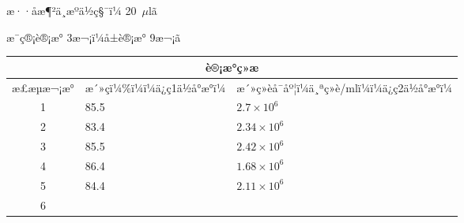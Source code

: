 \documentclass[UTF8,10pt,a4paper,fontset=fandol]{ctexart}
\newcommand{\fieldvalue}[1]{#1}
\newcommand{\handwritten}[1]{#1}
\begin{document}
æ··åæ¶²ä¸æºä½ç§¯ï¼
\fieldvalue{\handwritten{20}}~$\mu$lã

æ¯ç®¡è®¡æ°
\fieldvalue{\handwritten{3}}æ¬¡ï¼å±è®¡æ°
\fieldvalue{\handwritten{9}}æ¬¡ã

\begin{center}
\small
\begin{tabularx}{\textwidth}{|c|X|X|}
\hline
\multicolumn{3}{|c|}{è®¡æ°ç»æ}\\
\hline
æ£æµæ¬¡æ° & æ´»çï¼\%ï¼ï¼ä¿ç1ä½å°æ°ï¼ & æ´»ç»èå¯åº¦ï¼ä¸ªç»è/mlï¼ï¼ä¿ç2ä½å°æ°ï¼\\
\hline
1 &
\fieldvalue{\handwritten{85.5}} &
\fieldvalue{\handwritten{$2.7\times10^{6}$}}\\
\hline
2 &
\fieldvalue{\handwritten{83.4}} &
\fieldvalue{\handwritten{$2.34\times10^{6}$}}\\
\hline
3 &
\fieldvalue{\handwritten{85.5}} &
\fieldvalue{\handwritten{$2.42\times10^{6}$}}\\
\hline
4 &
\fieldvalue{\handwritten{86.4}} &
\fieldvalue{\handwritten{$1.68\times10^{6}$}}\\
\hline
5 &
\fieldvalue{\handwritten{84.4}} &
\fieldvalue{\handwritten{$2.11\times10^{6}$}}\\
\hline
6 &

\end{tabularx}
\end{center}
\end{document}

